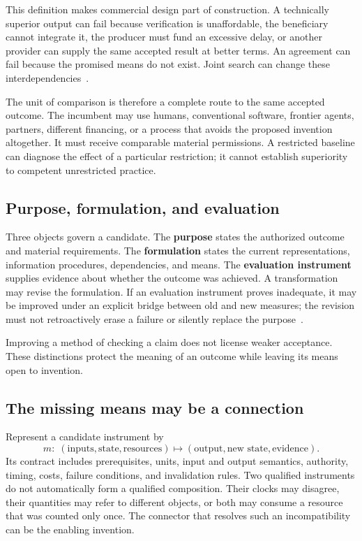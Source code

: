 \documentclass[10pt,a4paper]{article}
\begin{document}
This definition makes commercial design part of construction. A technically superior output can fail because verification is unaffordable, the beneficiary cannot integrate it, the producer must fund an excessive delay, or another provider can supply the same accepted result at better terms. An agreement can fail because the promised means do not exist. Joint search can change these interdependencies~\citep{economy}.

The unit of comparison is therefore a complete route to the same accepted outcome. The incumbent may use humans, conventional software, frontier agents, partners, different financing, or a process that avoids the proposed invention altogether. It must receive comparable material permissions. A restricted baseline can diagnose the effect of a particular restriction; it cannot establish superiority to competent unrestricted practice.

\subsection{Purpose, formulation, and evaluation}

Three objects govern a candidate. The \textbf{purpose} states the authorized outcome and material requirements. The \textbf{formulation} states the current representations, information procedures, dependencies, and means. The \textbf{evaluation instrument} supplies evidence about whether the outcome was achieved. A transformation may revise the formulation. If an evaluation instrument proves inadequate, it may be improved under an explicit bridge between old and new measures; the revision must not retroactively erase a failure or silently replace the purpose~\citep{ti,original}.

Improving a method of checking a claim does not license weaker acceptance. These distinctions protect the meaning of an outcome while leaving its means open to invention.

\subsection{The missing means may be a connection}

Represent a candidate instrument by
\begin{equation}
 m:\; (\text{inputs},\text{state},\text{resources})\longmapsto
 (\text{output},\text{new state},\text{evidence}).
\label{eq:instrument}
\end{equation}
Its contract includes prerequisites, units, input and output semantics, authority, timing, costs, failure conditions, and invalidation rules. Two qualified instruments do not automatically form a qualified composition. Their clocks may disagree, their quantities may refer to different objects, or both may consume a resource that was counted only once. The connector that resolves such an incompatibility can be the enabling invention.
\end{document}
